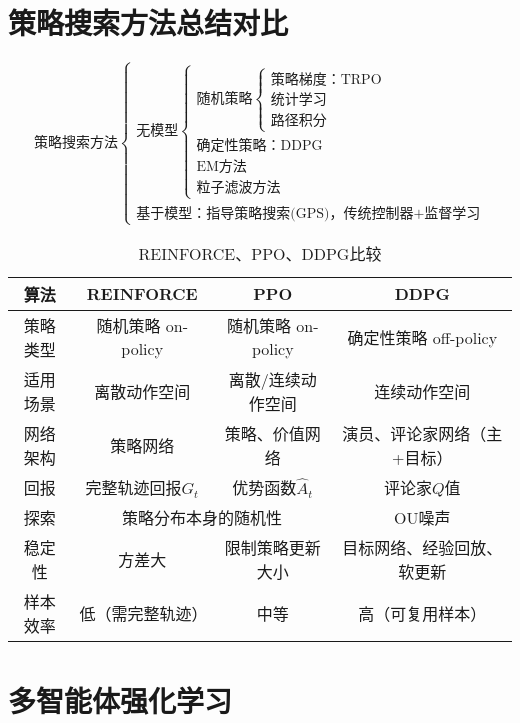 \documentclass[
12pt, %
a4paper, 
oneside, %
headinclude,footinclude, %
]{scrartcl}
\begin{document}
\section{策略搜索方法总结对比}
$$
\text{策略搜索方法} \begin{cases} 
\text{无模型} \begin{cases} 
\text{随机策略} \begin{cases} 
\text{策略梯度：TRPO} \\ \text{统计学习} \\ \text{路径积分} \end{cases} \\ 
\text{确定性策略：DDPG} \\ \text{EM方法} \\ \text{粒子滤波方法} \end{cases} \\ 
\text{基于模型：指导策略搜索(GPS)，传统控制器+监督学习} \end{cases}
$$

\begin{table}[H]
\centering
\small
\begin{tabular}{|c|c|c|c|}
\hline
算法 & REINFORCE & PPO & DDPG \\
\hline
策略类型 & 随机策略 on-policy & 随机策略 on-policy & 确定性策略 off-policy \\
\hline
适用场景 & 离散动作空间 & 离散/连续动作空间 & 连续动作空间 \\
\hline
网络架构 & 策略网络 & 策略、价值网络 & 演员、评论家网络（主+目标） \\
\hline
回报 & 完整轨迹回报$ G_t $ & 优势函数$ \hat{A}_t $ & 评论家$ Q $值 \\
\hline
探索 & \multicolumn{2}{c|}{策略分布本身的随机性} & OU噪声 \\
\hline
稳定性 & 方差大 & 限制策略更新大小 & 目标网络、经验回放、软更新 \\
\hline
样本效率 & 低（需完整轨迹） & 中等 & 高（可复用样本） \\
\hline
\end{tabular}
\caption{REINFORCE、PPO、DDPG比较}
\end{table}
\section{多智能体强化学习}
\end{document}
